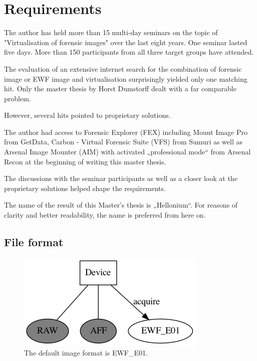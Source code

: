 \chapter{Requirements}
\label{chap:requirements}

The author has held more than 15 multi-day seminars on the topic of "Virtualisation of forensic images" over the last eight years. One seminar lasted five days. More than 150 participants from all three target groups have attended.

The evaluation of an extensive internet search for the combination of \glqq{}forensic image\grqq{} or \glqq{}EWF image\grqq{} and \glqq{}virtualisation\grqq{} surprisingly yielded only one matching hit. Only the master thesis by Horst Dumstorff dealt with a far comparable problem.

However, several hits pointed to proprietary solutions.

The author had access to Forensic Explorer (FEX) \cite{FEX} including Mount Image Pro from GetData, Carbon - Virtual Forensic Suite (VFS) \cite{Carbon} from Sumuri as well as Arsenal Image Mounter (AIM) \cite{AIM} with activated „professional mode“ from Arsenal Recon at the beginning of writing this master thesis.

The discussions with the seminar participants as well as a closer look at the proprietary solutions helped shape the requirements.

The name of the result of this Master's thesis is „Hellonium“. For reasons of clarity and better readability, the name is preferred from here on.

\section{File format}
\label{sec:fileformat}

\begin{figure}[htbp]  %
  \centering
  \includegraphics[width=.5\textwidth]{figures/device-to-image.png}
  \caption[Focus on EWF\_E01]{The default image format is EWF\_E01.}
  \label{fig:ewfe01}
\end{figure}

